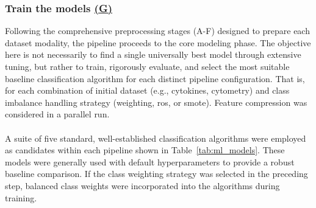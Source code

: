 \documentclass[12pt,a4paper]{report}
\begin{document}
\subsubsection*{Train the models \hyperref[fig:pipeline-1]{(G)}}
\noindent 
Following the comprehensive preprocessing stages (A-F) designed to prepare each dataset modality, the pipeline proceeds to the core modeling phase. The objective here is not necessarily to find a single universally best model through extensive tuning, but rather to train, rigorously evaluate, and select the most suitable baseline classification algorithm for each distinct pipeline configuration. That is, for each combination of initial dataset (e.g., cytokines, cytometry) and class imbalance handling strategy (weighting, \gls{ros}, or \gls{smote}). Feature compression was considered in a parallel run.\\
\\
A suite of five standard, well-established classification algorithms were employed as candidates within each pipeline shown in Table~\ref{tab:ml_models}. These models were generally used with default hyperparameters to provide a robust baseline comparison. If the class weighting strategy was selected in the preceding step, balanced class weights were incorporated into the algorithms during training.\\
\begin{table}[h!]
    \centering
    \caption[Machine Learning Models Used]{Machine Learning Models Used and their Configurations}
    \label{tab:ml_models}
\end{table}
\end{document}
